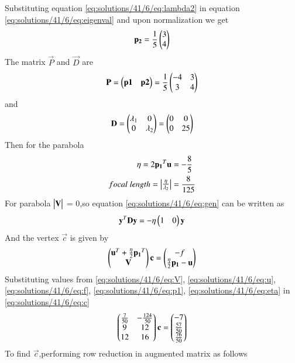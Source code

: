 Substituting equation \eqref{eq:solutions/41/6/eq:lambda2} in equation \eqref{eq:solutions/41/6/eq:eigenval} and upon normalization we get
\begin{align}
    \mathbf{p_2} = \frac{1}{5}\begin{pmatrix}3\\4\end{pmatrix}
\end{align}
The matrix $\vec{P}$ and $\vec{D}$ are
\begin{align}
    \mathbf{P} = \begin{pmatrix}\mathbf{p1}&\mathbf{p2}\end{pmatrix}=\frac{1}{5}\begin{pmatrix}-4&3\\3&4\end{pmatrix}
\end{align}
and
\begin{align}
    \mathbf{D} = \begin{pmatrix}\lambda_1&0\\0&\lambda_2\end{pmatrix} = \begin{pmatrix}0&0\\0&25\end{pmatrix}
\end{align}
Then for the parabola
\begin{align}
    \eta = 2\mathbf{p_1}^T\mathbf{u}&=-\frac{8}{5}\label{eq:solutions/41/6/eq:eta}\\
    focal\;length =\begin{vmatrix}\frac{\eta}{\lambda_2}\end{vmatrix}&=\frac{8}{125}
\end{align}
For parabola $\begin{vmatrix}\mathbf{V}\end{vmatrix}$ = 0,so equation \eqref{eq:solutions/41/6/eq:gen} can be written as
\begin{align}
    \mathbf{y}^T\mathbf{D}\mathbf{y}=-\eta\begin{pmatrix}1&0\end{pmatrix}\mathbf{y}
\end{align}
And the vertex $\vec{c}$ is given by
\begin{align}
    \begin{pmatrix}\mathbf{u}^T+\frac{\eta}{2}\mathbf{p_1}^T\\\mathbf{V}\end{pmatrix}\mathbf{c}=\begin{pmatrix}-f\\\frac{\eta}{2}\mathbf{p_1}-\mathbf{u}\end{pmatrix}\label{eq:solutions/41/6/eq:c}
\end{align}
Substituting values from \eqref{eq:solutions/41/6/eq:V}, \eqref{eq:solutions/41/6/eq:u}, \eqref{eq:solutions/41/6/eq:f}, \eqref{eq:solutions/41/6/eq:p1}, \eqref{eq:solutions/41/6/eq:eta} in \eqref{eq:solutions/41/6/eq:c}
\begin{align}
    \begin{pmatrix}\frac{7}{50}&-\frac{124}{50}\\9&12\\12&16\end{pmatrix}\mathbf{c}=\begin{pmatrix}-7\\\frac{57}{50}\\\frac{76}{50}\end{pmatrix}
\end{align}
To find $\vec{c}$,performing row reduction in augmented matrix as follows
